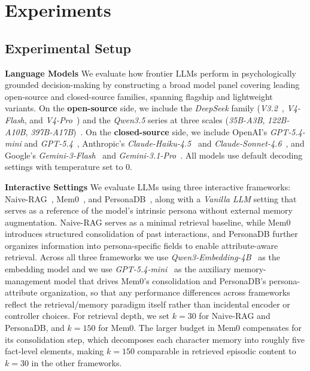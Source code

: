 \documentclass{article}
\begin{document}
\section{Experiments}

\subsection{Experimental Setup}

\textbf{Language Models}
We evaluate how frontier LLMs perform in psychologically grounded decision-making by constructing a broad model panel covering leading open-source and closed-source families, spanning flagship and lightweight variants. On the \textbf{open-source} side, we include the \textit{DeepSeek} family (\textit{V3.2}~\cite{deepseek_v3_2_2025}, \textit{V4-Flash}, and \textit{V4-Pro}~\cite{deepseek_v4_2026}) and the \textit{Qwen3.5} series at three scales (\textit{35B-A3B}, \textit{122B-A10B}, \textit{397B-A17B})~\cite{qwen35_2026}. On the \textbf{closed-source} side, we include OpenAI's \textit{GPT-5.4-mini} and \textit{GPT-5.4}~\cite{openai2026gpt54}, Anthropic's \textit{Claude-Haiku-4.5}~\cite{anthropic2025haiku45} and \textit{Claude-Sonnet-4.6}~\cite{anthropic2026sonnet46}, and Google's \textit{Gemini-3-Flash}~\cite{google2025gemini3flash} and \textit{Gemini-3.1-Pro}~\cite{google2026gemini31pro}. All models use default decoding settings with temperature set to 0.

\textbf{Interactive Settings}
We evaluate LLMs using three interactive frameworks: Naive-RAG~\cite{lewis2020retrieval}, Mem0~\cite{chhikara2025mem0}, and PersonaDB~\cite{sun2025persona}, along with a \textit{Vanilla LLM} setting that serves as a reference of the model’s intrinsic persona without external memory augmentation. Naive-RAG serves as a minimal retrieval baseline, while Mem0 introduces structured consolidation of past interactions, and PersonaDB further organizes information into persona-specific fields to enable attribute-aware retrieval. Across all three frameworks we use \textit{Qwen3-Embedding-4B}~\cite{qwen3embedding} as the embedding model and we use \textit{GPT-5.4-mini}~\cite{openai2026gpt54} as the auxiliary memory-management model that drives Mem0's consolidation and PersonaDB's persona-attribute organization, so that any performance differences across frameworks reflect the retrieval/memory paradigm itself rather than incidental encoder or controller choices. For retrieval depth, we set $k{=}30$ for Naive-RAG and PersonaDB, and $k{=}150$ for Mem0. The larger budget in Mem0 compensates for its consolidation step, which decomposes each character memory into roughly five fact-level elements, making $k{=}150$ comparable in retrieved episodic content to $k{=}30$ in the other frameworks.
\end{document}
